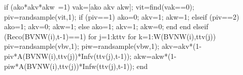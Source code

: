                                                                if (ako*akv*akw~=1)                                                                       
                                                                       vak=[ako akv akw];
                                                                       vit=find(vak==0); 
                                                                       piv=randsample(vit,1);
                                                                       if (piv==1)
                                                                            ako=0;
                                                                            akv=1;
                                                                            akw=1;
                                                                       elseif (piv==2)
                                                                            ako=1;
                                                                            akv=0;
                                                                            akw=1;
                                                                       else 
                                                                            ako=1;
                                                                            akv=1;
                                                                            akw=0;
                                                                       end                                                                       
                                                                end
                                          elseif (Reco(BVNW(i),t-1)==1)
                                                    for j=1:kttv                                                                                                  
                                                          for k=1:W(BVNW(i),ttv(j))                                                                
                                                                piv=randsample(vbv,1);
                                                                piw=randsample(vbw,1);
                                                                akv=akv*(1-piv*A(BVNW(i),ttv(j))*Infv(ttv(j),t-1));
                                                                akw=akw*(1-piw*A(BVNW(i),ttv(j))*Infw(ttv(j),t-1));                                                                 
                                                          end
                                                          
